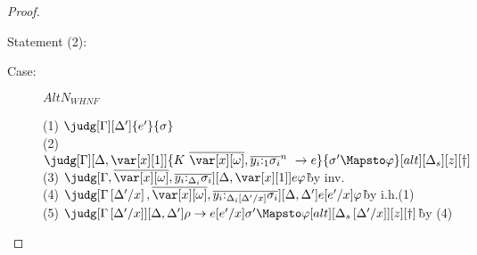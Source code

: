 \begin{proof}
\begin{description}


\end{description}

Statement (2):




\begin{description}
\item[Case:] $AltN_{WHNF}$
\begin{tabbing}
    (1) $\judg[\G][\D']{e'}{\s}$\\
    (2) $\judg[\G][\D,\xl]{\konstructor~\to e}{\s' \Mapsto \vp}[alt][\D_s][z][\dag]$\\
    (3) $\judg[\G,\ov{\xo},\ov{y_i{:}_{\D_i}\s_i}][\D,\xl]{e}{\vp}$\`by inv.\\
    (4) $\judg[\subst{\G}{\D'}{x},\ov{\xo},\ov{y_i{:}_{\subst{\D_i}{\D'}{x}}\s_i}][\D,\D']{e[e'/x]}{\vp}$\` by i.h.(1)\\
    (5) $\judg[\subst{\G}{\D'}{x}][\D,\D']{\rho \to e[e'/x]}{\s' \Mapsto \vp}[alt][\subst{\D_s}{\D'}{x}][z][\dag]$\` by (4)\\
\end{tabbing}


\end{description}
\end{proof}
